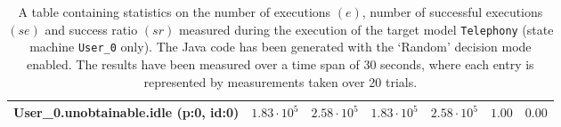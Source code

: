 \begin{table}[htbp]
{\begin{tabular}{lrrrrrr}
\hspace{3mm}User\_0.unobtainable.idle (p:0, id:0)    &  $1.83 \cdot 10^{5}$ &  $2.58 \cdot 10^{5}$ &  $1.83 \cdot 10^{5}$ &  $2.58 \cdot 10^{5}$ &               $1.00$ &               $0.00$ \\
\bottomrule
\end{tabular}
}
\caption{A table containing statistics on the number of executions $(e)$, number of successful executions $(se)$ and success ratio $(sr)$ measured during the execution of the target model \texttt{Telephony} (state machine \texttt{User\_0} only). The Java code has been generated with the `Random' decision mode enabled. The results have been measured over a time span of 30 seconds, where each entry is represented by measurements taken over 20 trials.}
\label{table:frequency_results_telephony_random_user_0}
\end{table}